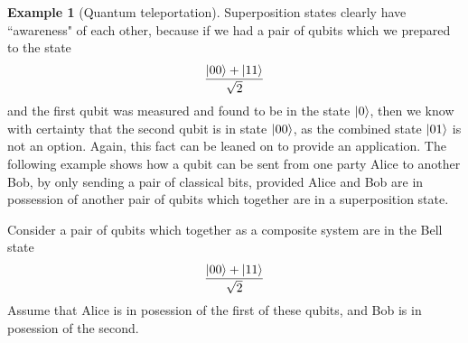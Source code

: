 \documentclass[12pt]{article}
\theoremstyle{plain}
\theoremstyle{definition}
\newtheorem{example}[thm]{Example}
\begin{document}
	\begin{example}[Quantum teleportation]\label{ex:quantum_teleportation}
		Superposition states clearly have ``awareness" of each other, because if we had a pair of qubits which we prepared to the state
		\begin{equation}
			\frac{\ket{00} + \ket{11}}{\sqrt{2}}
		\end{equation}
		and the first qubit was measured and found to be in the state $\ket{0}$, then we know with certainty that the second qubit is in state $\ket{00}$, as the combined state $\ket{01}$ is not an option. Again, this fact can be leaned on to provide an application. The following example shows how a qubit can be sent from one party Alice to another Bob, by only sending a pair of classical bits, provided Alice and Bob are in possession of another pair of qubits which together are in a superposition state.
		
		Consider a pair of qubits which together as a composite system are in the Bell state
		\begin{equation}
			\frac{\ket{00} + \ket{11}}{\sqrt{2}}
		\end{equation}
		Assume that Alice is in posession of the first of these qubits, and Bob is in posession of the second.
		

\end{example}
\end{document}
